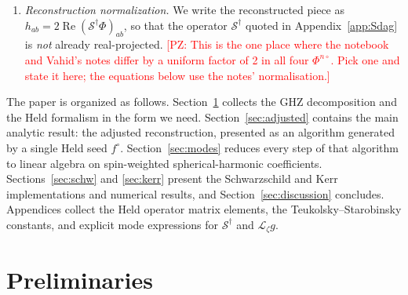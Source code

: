 \documentclass[preprint,aps,nofootinbib,a4paper,superscriptaddress,longbibliography,amsfonts, amssymb,amsmath,titlepage]{revtex4-1}
\numberwithin{equation}{section} %
\newcommand{\PZ}[1]{\textcolor{red}{\textsf{[PZ: #1]}}}
\renewcommand{\S}{{\mathcal S}}
\newcommand{\Lie}{{\mathcal L}}
\renewcommand{\Re}{\operatorname{Re}}
\def\fHo{f^{\circ}}
\newcommand{\PhiN}[1]{\Phi^{#1\circ}}
\begin{document}
\begin{enumerate}[label=(\roman*)]
\item \emph{Reconstruction normalization.}  We write the reconstructed
piece as $h_{ab}=2\Re(\S^\dagger\Phi)_{ab}$, so that the operator
$\S^{\dagger}$ quoted in Appendix~\ref{app:Sdag} is \emph{not} already
real-projected.
\PZ{This is the one place where the notebook and Vahid's notes differ by a
uniform factor of 2 in all four $\PhiN{n}$.  Pick one and state it here;
the equations below use the notes' normalisation.}
\end{enumerate}

The paper is organized as follows.  Section~\ref{sec:prelim} collects the
GHZ decomposition and the Held formalism in the form we need.
Section~\ref{sec:adjusted} contains the main analytic result: the adjusted
reconstruction, presented as an algorithm generated by a single Held seed
$\fHo$.  Section~\ref{sec:modes} reduces every step of that algorithm to
linear algebra on spin-weighted spherical-harmonic coefficients.
Sections~\ref{sec:schw} and \ref{sec:kerr} present the Schwarzschild and Kerr
implementations and numerical results, and Section~\ref{sec:discussion}
concludes.  Appendices collect the Held operator matrix elements, the
Teukolsky--Starobinsky constants, and explicit mode expressions for
$\S^{\dagger}$ and $\Lie_\zeta g$.


\section{Preliminaries}
\label{sec:prelim}
\end{document}
